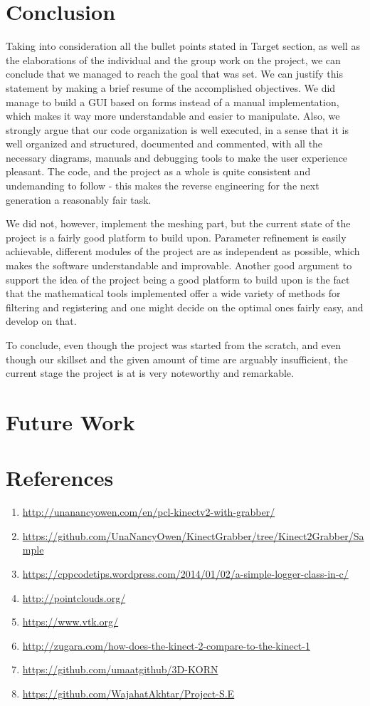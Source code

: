 \documentclass[aps,letterpaper,11pt]{revtex4}
\begin{document}
\section{Conclusion}
Taking into consideration all the bullet points stated in Target section, as well as the elaborations of the individual and the group work on the project, we can conclude that we managed to reach the goal that was set. We can justify this statement by making a brief resume of the accomplished objectives. We did manage to build a GUI based on forms instead of a manual implementation, which makes it way more understandable and easier to manipulate. Also, we strongly argue that our code organization is well executed, in a sense that it is well organized and structured, documented and commented, with all the necessary diagrams, manuals and debugging tools to make the user experience pleasant. The code, and the project as a whole is quite consistent and undemanding to follow - this makes the reverse engineering for the next generation a reasonably fair task.\par
We did not, however, implement the meshing part, but the current state of the project is a fairly good platform to build upon. Parameter refinement is easily achievable, different modules of the project are as independent as possible, which makes the software understandable and improvable. Another good argument to support the idea of the project being a good platform to build upon is the fact that the mathematical tools implemented offer a wide variety of methods for filtering and registering and one might decide on the optimal ones fairly easy, and develop on that. \par
To conclude, even though the project was started from the scratch, and even though our skillset and the given amount of time are arguably insufficient, the current stage the project is at is very noteworthy and remarkable. 
\pagebreak

\section{Future Work}
\pagebreak

\section{References}
\begin{enumerate}
\item \url{http://unanancyowen.com/en/pcl-kinectv2-with-grabber/}
\item \url{https://github.com/UnaNancyOwen/KinectGrabber/tree/Kinect2Grabber/Sample}
\item \url{https://cppcodetips.wordpress.com/2014/01/02/a-simple-logger-class-in-c/}
\item \url{http://pointclouds.org/}
\item \url{https://www.vtk.org/}
\item \url{http://zugara.com/how-does-the-kinect-2-compare-to-the-kinect-1}
\item \url{https://github.com/umaatgithub/3D-KORN}
\item \url{https://github.com/WajahatAkhtar/Project-S.E}
\end{enumerate}
\end{document}
